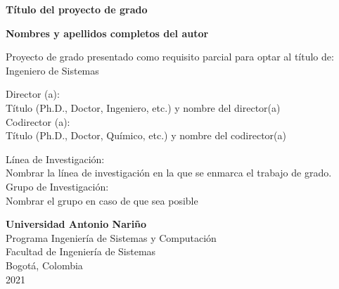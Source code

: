 \begin{titlepage}
    \begin{center}
        \vspace*{1cm}

        \Huge
        \textbf{Título del proyecto de grado}
 
        \vfill
        
        \large
        \textbf{Nombres y apellidos completos del autor}\\
 
        \vfill

        Proyecto de grado presentado como requisito parcial para optar al título de:\\
        Ingeniero de Sistemas\\

        \vfill

        Director (a):\\
        Título (Ph.D., Doctor, Ingeniero, etc.) y nombre del director(a)\\
        Codirector (a):\\
        Título (Ph.D., Doctor, Químico, etc.) y nombre del codirector(a)\\

        \vfill

        Línea de Investigación:\\
        Nombrar la línea de investigación en la que se enmarca el trabajo de grado.\\
        Grupo de Investigación:\\
        Nombrar el grupo en caso de que sea posible\\

             
        \vspace{0.8cm}
             
        \textbf{Universidad Antonio Nariño}\\
        Programa Ingeniería de Sistemas y Computación\\
        Facultad de Ingeniería de Sistemas\\
        Bogotá, Colombia\\
        2021
    \end{center}
\end{titlepage}
